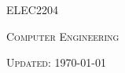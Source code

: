 \documentclass[a4paper,11pt]{article}
\begin{document}

\begin{center}
    {\scshape\huge ELEC2204\par} \vspace{0.5cm}
    {\scshape\Large Computer Engineering\par} \vspace{2cm}
    {\scshape Updated: \today}
\end{center}
\pagebreak

\tableofcontents \pagebreak



\end{document}
